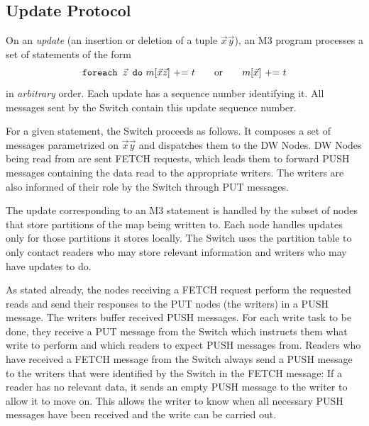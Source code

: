 

\subsection{Update Protocol}


On an {\em update} (an insertion or deletion of a tuple
$\vec{x}\vec{y}$), an M3 program processes a set of statements of the form
\[
\mbox{{\tt foreach $\vec{z}$ do} $m[\vec{x}\vec{z}]$ += $t$
~~~~~or~~~~~ $m[\vec{x}]$ += $t$}
\]
in {\em arbitrary}\/ order.
%
Each update has a sequence number identifying it. All messages sent by the
Switch contain this update sequence number.

For a given statement, the Switch proceeds as follows.
It composes a set of messages parametrized on $\vec{x}\vec{y}$ and
dispatches them to the DW Nodes.
DW Nodes being read from are sent FETCH requests, which leads them to forward
PUSH messages containing the data read
to the appropriate writers. The writers are also
informed of their role by the Switch through PUT messages.

The update corresponding to an M3 statement is handled by the subset of
nodes that store partitions of the map being written to.  Each node
handles updates only for those partitions it stores locally. The Switch
uses the partition table to only contact readers who may store relevant information and writers who may have updates to do. 


As stated already, the nodes receiving a FETCH request perform the
requested reads and send their responses to the PUT nodes (the writers)
in a PUSH message.
The writers buffer received PUSH messages. For each write task to be
done, they receive a PUT message from the Switch which instructs them
what write to perform and which readers to expect PUSH messages from.
Readers who have received a FETCH message from the Switch always
send a PUSH message to the writers that were
identified by the Switch in the FETCH
message: If a reader has no relevant data, it sends an empty PUSH message to
the writer to allow it to move on.
This allows the writer to know when all necessary PUSH messages have been
received and the write can be carried out.

